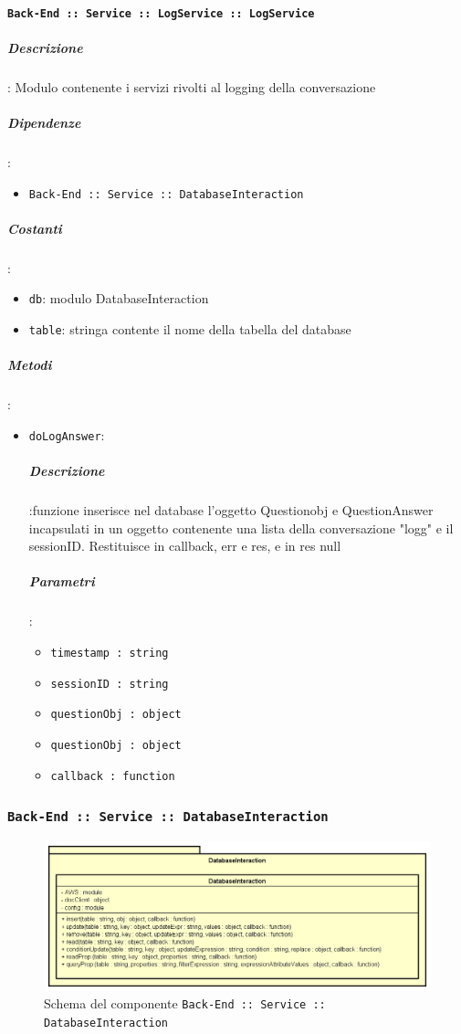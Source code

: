 \documentclass[../DefinizioneDiProdotto_v2.0.0.tex]{subfiles}
\begin{document}
\paragraph{\texttt{Back-End :: Service :: LogService :: LogService}}
\subparagraph{Descrizione}: Modulo contenente i servizi rivolti al logging della conversazione
\subparagraph{Dipendenze}:
\begin{itemize}
	\item \texttt{Back-End :: Service :: DatabaseInteraction}
\end{itemize}
\subparagraph{Costanti}:
\begin{itemize}
	\item \texttt{db}: modulo DatabaseInteraction
	\item \texttt{table}: stringa contente il nome della tabella del database
\end{itemize}
\subparagraph{Metodi}:\begin{itemize}
\item \texttt{doLogAnswer}:
\subparagraph{Descrizione}:funzione inserisce nel database l'oggetto Questionobj e QuestionAnswer incapsulati in un oggetto contenente una lista della conversazione "logg" e il sessionID. Restituisce in callback, err e res, e in res null
\subparagraph{Parametri}:
\begin{itemize}
	\item \texttt{timestamp : string}
	\item \texttt{sessionID : string}
	\item \texttt{questionObj : object}
	\item \texttt{questionObj : object}
	\item \texttt{callback : function}
\end{itemize}
\end{itemize}

\newpage
\subsubsection{\texttt{Back-End :: Service :: DatabaseInteraction}}
\begin{figure}[!h]
	\centering
	\includegraphics[scale=0.5]{Architettura/Back-End/Service/DatabaseInteraction.png}
	\caption{Schema del componente \texttt{Back-End :: Service :: DatabaseInteraction}}
\end{figure}
\end{document}
